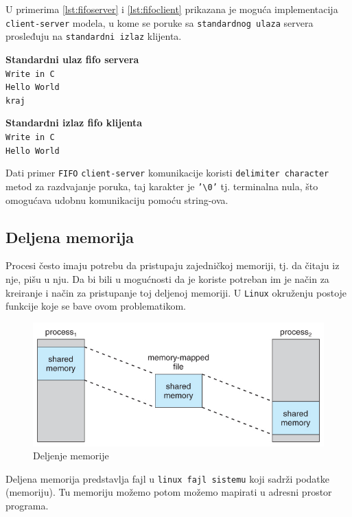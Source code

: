 \documentclass[a4paper, 11pt, twoside]{article}
\newcommand{\scode}[3] {
	\hspace{.06\textwidth} 
	\begin{minipage}[t]{.88\textwidth} %
		\begin{mdframed}[topline=true,bottomline=true,leftline=true,rightline=true,backgroundcolor=gray!22, linecolor=gray!60!black,roundcorner=1mm]
			 

	\begin{center}
		\caption{\textbf{Primer \ref{lst:#3}:} #2}
	\end{center}
	\end{mdframed}
	\end{minipage}

}
\newcommand{\stdio}[4] {
	\hspace{.06\textwidth} 
	\begin{minipage}[t]{.88\textwidth} %
		\begin{mdframed}[backgroundcolor=black!7,topline=true,bottomline=true,leftline=true,rightline=true,roundcorner=1mm]
		\begin{minipage}[t]{.5\textwidth} %
			\textbf{#1} \\
				\texttt{#3}
		\end{minipage}
		\begin{minipage}[t]{.5\textwidth} %
			\textbf{#2} \\
				\texttt{#4}
		\end{minipage}
		\end{mdframed}
	\end{minipage}
	\vspace{3mm} 
}
\begin{document}
\newpage

U primerima \ref{lst:fifoserver} i \ref{lst:fifoclient} prikazana je moguća implementacija \texttt{client-server} modela, u kome se poruke sa \texttt{standardnog ulaza} servera prosleđuju na \texttt{standardni izlaz} klijenta.

\vspace{2mm} 
\scode{fifo_server.c}{Fifo server}{fifoserver}

\scode{fifo_client.c}{Fifo klijent}{fifoclient}
\stdio{Standardni ulaz fifo servera}{Standardni izlaz fifo klijenta}{Write in C \\ Hello World \\ kraj}{Write in C \\ Hello World}
\vspace{2mm} 

Dati primer \texttt{FIFO} \texttt{client-server} komunikacije koristi \texttt{delimiter character} metod za razdvajanje poruka, taj karakter je \texttt{'\textbackslash0'} tj. terminalna nula, što omogućava udobnu komunikaciju pomoću string-ova. 

\newpage

\subsection{Deljena memorija}
Procesi često imaju potrebu da pristupaju zajedničkoj memoriji, tj. da čitaju iz nje, pišu u nju. 
Da bi bili u mogućnosti da je koriste potreban im je način za kreiranje i način za pristupanje toj deljenoj memoriji. U \texttt{Linux} okruženju postoje funkcije koje se bave ovom problematikom.

\begin{figure}[h]
	\centering
	\includegraphics[width=.7\textwidth]{shm.jpg} %
	\caption{Deljenje memorije}
	\label{fig:shm}
\end{figure}

Deljena memorija predstavlja fajl u \texttt{linux fajl sistemu} koji sadrži podatke (memoriju). Tu memoriju možemo potom možemo mapirati u adresni prostor programa. 
\end{document}
